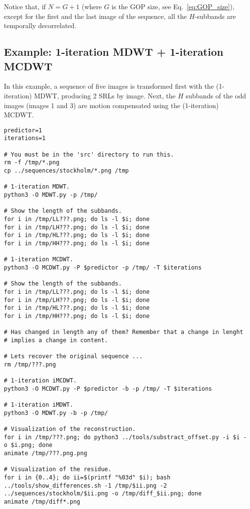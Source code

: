 Notice that, if $N=G+1$ (where $G$ is the GOP size, see
Eq.~\ref{eq:GOP_size}), except for the first and the last image of the
sequence, all the $H$-subbands are temporally decorrelated.

\subsection*{Example: 1-iteration MDWT + 1-iteration MCDWT}
In this example, a sequence of five images is transformed first with
the (1-iteration) MDWT, producing 2 SRLs by image. Next, the $H$
subbands of the odd images (images 1 and 3) are motion compensated
using the (1-iteration) MCDWT.

\begin{verbatim}
predictor=1
iterations=1

# You must be in the 'src' directory to run this.
rm -f /tmp/*.png
cp ../sequences/stockholm/*.png /tmp

# 1-iteration MDWT.
python3 -O MDWT.py -p /tmp/

# Show the length of the subbands.
for i in /tmp/LL???.png; do ls -l $i; done
for i in /tmp/LH???.png; do ls -l $i; done
for i in /tmp/HL???.png; do ls -l $i; done
for i in /tmp/HH???.png; do ls -l $i; done

# 1-iteration MCDWT.
python3 -O MCDWT.py -P $predictor -p /tmp/ -T $iterations

# Show the length of the subbands.
for i in /tmp/LL???.png; do ls -l $i; done
for i in /tmp/LH???.png; do ls -l $i; done
for i in /tmp/HL???.png; do ls -l $i; done
for i in /tmp/HH???.png; do ls -l $i; done

# Has changed in length any of them? Remember that a change in lenght
# implies a change in content.

# Lets recover the original sequence ...
rm /tmp/???.png

# 1-iteration iMCDWT.
python3 -O MCDWT.py -P $predictor -b -p /tmp/ -T $iterations

# 1-iteration iMDWT.
python3 -O MDWT.py -b -p /tmp/

# Visualization of the reconstruction.
for i in /tmp/???.png; do python3 ../tools/substract_offset.py -i $i -o $i.png; done
animate /tmp/???.png.png

# Visualization of the residue.
for i in {0..4}; do ii=$(printf "%03d" $i); bash ../tools/show_differences.sh -1 /tmp/$ii.png -2 ../sequences/stockholm/$ii.png -o /tmp/diff_$ii.png; done
animate /tmp/diff*.png
\end{verbatim}

